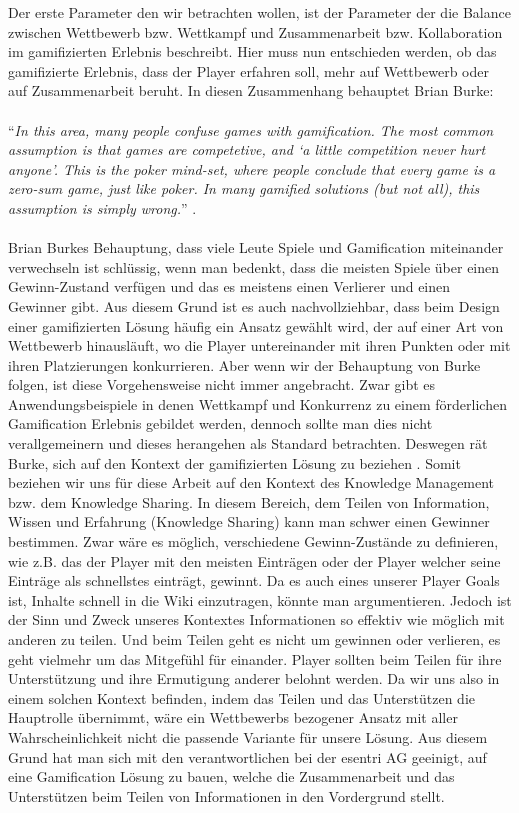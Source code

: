 \documentclass[a4paper,12pt,twoside]{scrartcl}
\begin{document}
Der erste Parameter den wir betrachten wollen, ist der Parameter der die Balance zwischen Wettbewerb bzw. Wettkampf und Zusammenarbeit bzw. Kollaboration im gamifizierten Erlebnis beschreibt. Hier muss nun entschieden werden, ob das gamifizierte Erlebnis, dass der Player erfahren soll, mehr auf Wettbewerb oder auf Zusammenarbeit beruht. In diesen Zusammenhang behauptet Brian Burke:
\\\\
\enquote{\textit{In this area, many people confuse games with gamification. The most common assumption is that games are competetive, and \enquote{a little competition never hurt anyone}. This is the poker mind-set, where people conclude that every game is a zero-sum game, just like poker. In many gamified solutions (but not all), this assumption is simply wrong.}} \cite{gamificationDefinition}. 
\\\\
Brian Burkes Behauptung, dass viele Leute Spiele und Gamification miteinander verwechseln ist schlüssig, wenn man bedenkt, dass die meisten Spiele über einen Gewinn-Zustand verfügen und das es meistens einen Verlierer und einen Gewinner gibt. Aus diesem Grund ist es auch nachvollziehbar, dass beim Design einer gamifizierten Lösung häufig ein Ansatz gewählt wird, der auf einer Art von Wettbewerb hinausläuft, wo die Player untereinander mit ihren Punkten oder mit ihren Platzierungen konkurrieren. Aber wenn wir der Behauptung von Burke folgen, ist diese Vorgehensweise nicht immer angebracht. Zwar gibt es Anwendungsbeispiele in denen Wettkampf und Konkurrenz zu einem förderlichen Gamification Erlebnis gebildet werden, dennoch sollte man dies nicht verallgemeinern und dieses herangehen als Standard betrachten. Deswegen rät Burke, sich auf den Kontext der gamifizierten Lösung zu beziehen \cite{gamificationDefinition}. Somit beziehen wir uns für diese Arbeit auf den Kontext des Knowledge Management bzw. dem Knowledge Sharing. In diesem Bereich, dem Teilen von Information, Wissen und Erfahrung (Knowledge Sharing) kann man schwer einen Gewinner bestimmen. Zwar wäre es möglich, verschiedene Gewinn-Zustände zu definieren, wie z.B. das der Player mit den meisten Einträgen oder der Player welcher seine Einträge als schnellstes einträgt, gewinnt. Da es auch eines unserer Player Goals ist, Inhalte schnell in die Wiki einzutragen, könnte man argumentieren. Jedoch ist der Sinn und Zweck unseres Kontextes Informationen so effektiv wie möglich mit anderen zu teilen. Und beim Teilen geht es nicht um gewinnen oder verlieren, es geht vielmehr um das Mitgefühl für einander. Player sollten beim Teilen für ihre Unterstützung und ihre Ermutigung anderer belohnt werden. Da wir uns also in einem solchen Kontext befinden, indem das Teilen und das Unterstützen die Hauptrolle übernimmt, wäre ein Wettbewerbs bezogener Ansatz mit aller Wahrscheinlichkeit nicht die passende Variante für unsere Lösung. Aus diesem Grund hat man sich mit den verantwortlichen bei der esentri AG geeinigt, auf eine Gamification Lösung zu bauen, welche die Zusammenarbeit und das Unterstützen beim Teilen von Informationen in den Vordergrund stellt.
\end{document}
